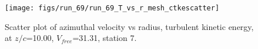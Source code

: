 \begin{figure}[H]
\centering
\texttt{[image: figs/run\_69/run\_69\_T\_vs\_r\_mesh\_ctkescatter]}
\caption{Scatter plot of azimuthal velocity vs radius, turbulent kinetic energy, at $z/c$=10.00, $V_{free}$=31.31, station 7.}
\label{fig:run_69_T_vs_r_mesh_ctkescatter}
\end{figure}


